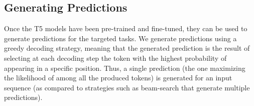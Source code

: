 \subsection{Generating Predictions}
Once the T5 models have been pre-trained and fine-tuned, they can be used to generate predictions for the targeted tasks. We generate predictions using a greedy decoding strategy, meaning that the generated prediction is the result of selecting at each decoding step the token with the highest probability of appearing in a specific position. Thus, a single prediction (\ie the one maximizing the likelihood of among all the produced tokens) is generated for an input sequence (as compared to strategies such as beam-search\cite{freitag2017beam} that generate multiple predictions).
